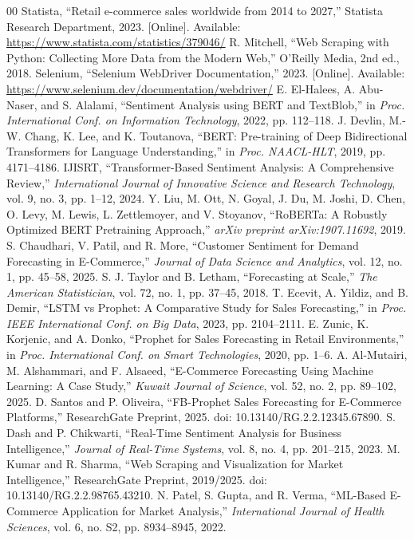 \documentclass[conference]{IEEEtran}
\begin{document}
\begin{thebibliography}{00}
 Statista, ``Retail e-commerce sales worldwide from 2014 to 2027,'' Statista Research Department, 2023. [Online]. Available: \url{https://www.statista.com/statistics/379046/}
 R. Mitchell, ``Web Scraping with Python: Collecting More Data from the Modern Web,'' O'Reilly Media, 2nd ed., 2018.
 Selenium, ``Selenium WebDriver Documentation,'' 2023. [Online]. Available: \url{https://www.selenium.dev/documentation/webdriver/}
 E. El-Halees, A. Abu-Naser, and S. Alalami, ``Sentiment Analysis using BERT and TextBlob,'' in \emph{Proc. International Conf. on Information Technology}, 2022, pp. 112--118.
 J. Devlin, M.-W. Chang, K. Lee, and K. Toutanova, ``BERT: Pre-training of Deep Bidirectional Transformers for Language Understanding,'' in \emph{Proc. NAACL-HLT}, 2019, pp. 4171--4186.
 IJISRT, ``Transformer-Based Sentiment Analysis: A Comprehensive Review,'' \emph{International Journal of Innovative Science and Research Technology}, vol. 9, no. 3, pp. 1--12, 2024.
 Y. Liu, M. Ott, N. Goyal, J. Du, M. Joshi, D. Chen, O. Levy, M. Lewis, L. Zettlemoyer, and V. Stoyanov, ``RoBERTa: A Robustly Optimized BERT Pretraining Approach,'' \emph{arXiv preprint arXiv:1907.11692}, 2019.
 S. Chaudhari, V. Patil, and R. More, ``Customer Sentiment for Demand Forecasting in E-Commerce,'' \emph{Journal of Data Science and Analytics}, vol. 12, no. 1, pp. 45--58, 2025.
 S. J. Taylor and B. Letham, ``Forecasting at Scale,'' \emph{The American Statistician}, vol. 72, no. 1, pp. 37--45, 2018.
 T. Ecevit, A. Yildiz, and B. Demir, ``LSTM vs Prophet: A Comparative Study for Sales Forecasting,'' in \emph{Proc. IEEE International Conf. on Big Data}, 2023, pp. 2104--2111.
 E. Zunic, K. Korjenic, and A. Donko, ``Prophet for Sales Forecasting in Retail Environments,'' in \emph{Proc. International Conf. on Smart Technologies}, 2020, pp. 1--6.
 A. Al-Mutairi, M. Alshammari, and F. Alsaeed, ``E-Commerce Forecasting Using Machine Learning: A Case Study,'' \emph{Kuwait Journal of Science}, vol. 52, no. 2, pp. 89--102, 2025.
 D. Santos and P. Oliveira, ``FB-Prophet Sales Forecasting for E-Commerce Platforms,'' ResearchGate Preprint, 2025. doi: 10.13140/RG.2.2.12345.67890.
 S. Dash and P. Chikwarti, ``Real-Time Sentiment Analysis for Business Intelligence,'' \emph{Journal of Real-Time Systems}, vol. 8, no. 4, pp. 201--215, 2023.
 M. Kumar and R. Sharma, ``Web Scraping and Visualization for Market Intelligence,'' ResearchGate Preprint, 2019/2025. doi: 10.13140/RG.2.2.98765.43210.
 N. Patel, S. Gupta, and R. Verma, ``ML-Based E-Commerce Application for Market Analysis,'' \emph{International Journal of Health Sciences}, vol. 6, no. S2, pp. 8934--8945, 2022.
\end{thebibliography}
\end{document}
